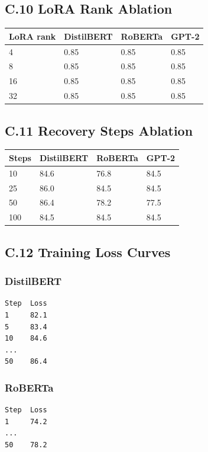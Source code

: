 \subsection{C.10 LoRA Rank Ablation}

\begin{table}[H]
\centering
\small
\begin{tabular}{llll}
\toprule
\textbf{LoRA rank} & \textbf{DistilBERT} & \textbf{RoBERTa} & \textbf{GPT-2} \\
\midrule
4 & 0.85 & 0.85 & 0.85 \\
8 & 0.85 & 0.85 & 0.85 \\
16 & 0.85 & 0.85 & 0.85 \\
32 & 0.85 & 0.85 & 0.85 \\
\bottomrule
\end{tabular}
\end{table}

\subsection{C.11 Recovery Steps Ablation}

\begin{table}[H]
\centering
\small
\begin{tabular}{llll}
\toprule
\textbf{Steps} & \textbf{DistilBERT} & \textbf{RoBERTa} & \textbf{GPT-2} \\
\midrule
10 & 84.6 & 76.8 & 84.5 \\
25 & 86.0 & 84.5 & 84.5 \\
50 & 86.4 & 78.2 & 77.5 \\
100 & 84.5 & 84.5 & 84.5 \\
\bottomrule
\end{tabular}
\end{table}

\subsection{C.12 Training Loss Curves}

\subsubsection{DistilBERT}
\begin{lstlisting}
Step  Loss
1     82.1
5     83.4
10    84.6
...
50    86.4
\end{lstlisting}

\subsubsection{RoBERTa}
\begin{lstlisting}
Step  Loss
1     74.2
...
50    78.2
\end{lstlisting}

